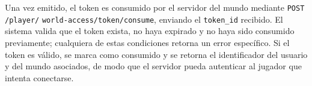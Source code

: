Una vez emitido, el token es consumido por el servidor del mundo mediante
\texttt{POST /player/} \texttt{world-access/token/consume}, enviando el \texttt{token\_id} recibido. El sistema valida
que el token exista, no haya expirado y no haya sido consumido previamente; cualquiera de estas condiciones
retorna un error específico. Si el token es válido, se marca como consumido y se retorna el identificador del
usuario y del mundo asociados, de modo que el servidor pueda autenticar al jugador que intenta conectarse.
\vspace{0.25cm}
